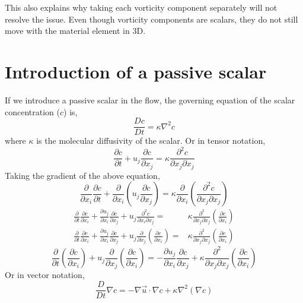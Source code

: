 \documentclass{article}
\begin{document}
This also explains why taking each vorticity component separately will not resolve the issue. Even though vorticity components are scalars, they do not still move with the material element in 3D. 

\section{Introduction of a passive scalar}
If we introduce a passive scalar in the flow, the governing equation of the scalar concentration ($c$) is, 
\begin{equation}
\frac{Dc}{Dt}=\kappa \nabla ^2 c
\end{equation}
where $\kappa$ is the molecular diffusivity of the scalar. 
Or in tensor notation,
\begin{equation}
\frac{\partial c}{\partial t}+u_j\frac{\partial c}{\partial x_j}=\kappa \frac{\partial^2 c }{\partial x_j \partial x_j}
\end{equation}
Taking the gradient of the above equation,
\begin{equation}
\frac{\partial}{\partial x_i}\frac{\partial c}{\partial t}+\frac{\partial}{\partial x_i}\left( u_j\frac{\partial c}{\partial x_j} \right) = \kappa \frac{\partial}{\partial x_i} \left( \frac{\partial^2 c }{\partial x_j \partial x_j} \right)
\end{equation}
\begin{align*}
\frac{\partial}{\partial t} \frac{\partial c}{\partial x_i}+\frac{\partial u_j}{\partial x_i}\frac{\partial c}{\partial x_j} +u_j \frac{\partial^2 c }{\partial x_i \partial x_j}=&\kappa \frac{\partial^2 }{\partial x_j \partial x_j} \left(  \frac{\partial c}{\partial x_i} \right) \\
\frac{\partial}{\partial t} \frac{\partial c}{\partial x_i}+\frac{\partial u_j}{\partial x_i}\frac{\partial c}{\partial x_j} +u_j \frac{\partial }{\partial x_j}\left(\frac{\partial c}{\partial x_i}\right)=&\kappa \frac{\partial^2 }{\partial x_j \partial x_j} \left(  \frac{\partial c}{\partial x_i} \right)
\end{align*}
\begin{equation}\label{eq:scalar_grad}
\frac{\partial}{\partial t} \left(\frac{\partial c}{\partial x_i}\right) +u_j \frac{\partial }{\partial x_j}\left(\frac{\partial c}{\partial x_i}\right)= -\frac{\partial u_j}{\partial x_i}\frac{\partial c}{\partial x_j} +\kappa \frac{\partial^2 }{\partial x_j \partial x_j} \left(  \frac{\partial c}{\partial x_i} \right) 
\end{equation}
Or in vector notation,
\begin{equation}\label{eq:scalar_grad1}
\frac{D}{Dt}\nabla c=-\nabla \vec{u} \cdot \nabla c + \kappa \nabla^2 (\nabla c)
\end{equation}
\end{document}
